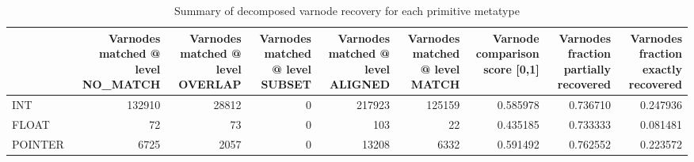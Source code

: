 \begin{table}
\centering
\caption{Summary of decomposed varnode recovery for each primitive metatype}
\label{table:metatype-recovery-summary-with-levels-decomposed}
\begin{tabular}{lrrrrrrrr}
\toprule
{} &  Varnodes matched @ level NO\_MATCH &  Varnodes matched @ level OVERLAP &  Varnodes matched @ level SUBSET &  Varnodes matched @ level ALIGNED &  Varnodes matched @ level MATCH &  Varnode comparison score [0,1] &  Varnodes fraction partially recovered &  Varnodes fraction exactly recovered \\
\midrule
INT     &                             132910 &                             28812 &                                0 &                            217923 &                          125159 &                        0.585978 &                               0.736710 &                             0.247936 \\
FLOAT   &                                 72 &                                73 &                                0 &                               103 &                              22 &                        0.435185 &                               0.733333 &                             0.081481 \\
POINTER &                               6725 &                              2057 &                                0 &                             13208 &                            6332 &                        0.591492 &                               0.762552 &                             0.223572 \\
\bottomrule
\end{tabular}
\end{table}
